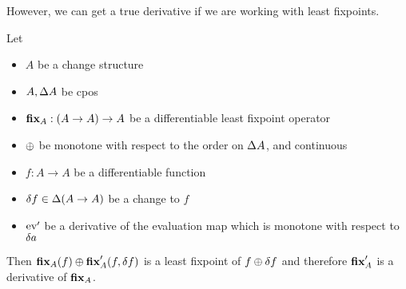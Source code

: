 However, we can get a true derivative if we are working with least fixpoints.

\begin{thm}
\label{thm:leastFixpointDiff}
  Let 
  \begin{itemize}
    \item $A$ be a change structure 
    \item $A, \Delta A$ be cpos
    \item$\textbf{fix}_A : (A \rightarrow A) \rightarrow A$ be a differentiable
      least fixpoint operator
    \item $\oplus$ be monotone with respect to the order on $\Delta A$, and continuous
    \item $f: A \rightarrow A$ be a differentiable function
    \item $\delta f \in \Delta (A \rightarrow A)$ be a change to $f$
    \item $\operatorname{ev}'$ be a derivative of the evaluation map which is monotone
      with respect to $\delta a$
  \end{itemize}

  Then $\textbf{fix}_A(f) \oplus \textbf{fix}_A'(f, \delta f)$ is a least
  fixpoint of $f \oplus \delta f$ and therefore $\textbf{fix}_A'$ is a derivative of $\textbf{fix}_A$.
\end{thm}
